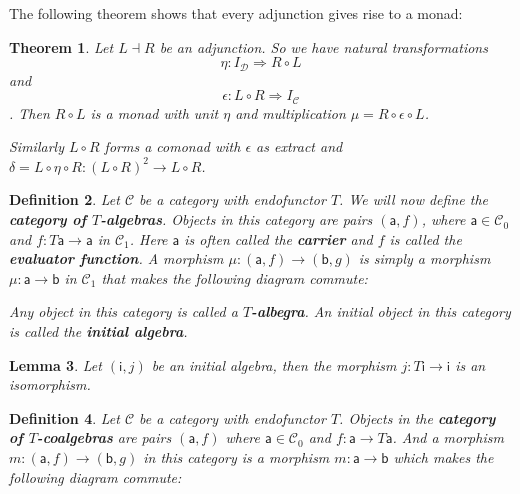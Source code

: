 \documentclass{article}
\newcommand{\cat}[1]{\mathcal{#1}} %
\newcommand{\cato}[1]{\cat{#1}_0} %
\newcommand{\catm}[1]{\cat{#1}_1} %
\newcommand{\ob}[1]{\mathsf{#1}} %
\newtheorem{theorem}{Theorem}
\newtheorem{lemma}[theorem]{Lemma}
\newtheorem{definition}[theorem]{Definition}
\begin{document}
The following theorem shows that every adjunction gives rise to a monad:

\begin{theorem}
	Let $L \dashv R$ be an adjunction. So we have natural transformations $$\eta: I_\cat{D} \Rightarrow R \circ L$$ and $$ \epsilon: L \circ R \Rightarrow I_\cat{C} $$.
	Then $R \circ L$ is a monad with unit $\eta$ and multiplication $\mu = R \circ \epsilon \circ L$.

	Similarly $L \circ R$ forms a comonad with $\epsilon$ as extract and $\delta = L \circ \eta \circ R: (L \circ R)^2 \rightarrow L \circ R$.
\end{theorem}

\begin{definition}
	Let $\cat{C}$ be a category with endofunctor $T$. We will now define the \textbf{category of $T$-algebras}.
	Objects in this category are pairs $(\ob{a}, f)$, where $\ob{a} \in \cato{C}$ and $f: T\ob{a} \rightarrow \ob{a}$ in $\catm{C}$.
	Here $\ob{a}$ is often called the \textbf{carrier} and $f$ is called the \textbf{evaluator function}.
	A morphism $\mu: (\ob{a}, f) \rightarrow (\ob{b}, g)$ is simply a morphism $\mu: \ob{a} \rightarrow \ob{b}$ in $\catm{C}$ that makes the following diagram commute:


	Any object in this category is called a \textbf{$T$-albegra}.
	An initial object in this category is called the \textbf{initial algebra}.
\end{definition}

\begin{lemma}
	Let $(\ob{i}, j)$ be an initial algebra, then the morphism $j: T\ob{i} \rightarrow \ob{i}$ is an isomorphism.
\end{lemma}

\begin{definition}
	Let $\cat{C}$ be a category with endofunctor $T$. Objects in the \textbf{category of $T$-coalgebras} are pairs $(\ob{a}, f)$ where $\ob{a} \in \cato{C}$ and $f: \ob{a} \rightarrow T\ob{a}$.
	And a morphism $m: (\ob{a}, f) \rightarrow (\ob{b}, g)$ in this category is a morphism $m: \ob{a} \rightarrow \ob{b}$ which makes the following diagram commute:

\end{definition}
\end{document}
